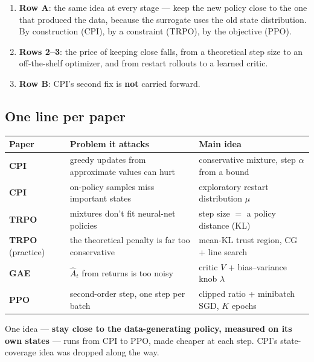 \begin{enumerate}
  \item \textbf{Row A}: the same idea at every stage --- keep the new policy close to the one that produced the data, because the surrogate uses the old state distribution. By construction (CPI), by a constraint (TRPO), by the objective (PPO).
  \item \textbf{Rows 2--3}: the price of keeping close falls, from a theoretical step size to an off-the-shelf optimizer, and from restart rollouts to a learned critic.
  \item \textbf{Row B}: CPI's second fix is \textbf{not} carried forward.
\end{enumerate}

\subsection{One line per paper}

\begin{center}
\small
\begin{tabularx}{\linewidth}{@{}l L L@{}}
\toprule
\textbf{Paper} & \textbf{Problem it attacks} & \textbf{Main idea} \\
\midrule
\textbf{CPI} & greedy updates from approximate values can hurt & conservative mixture, step $\alpha$ from a bound \\
\textbf{CPI} & on-policy samples miss important states & exploratory restart distribution $\mu$ \\
\textbf{TRPO} & mixtures don't fit neural-net policies & step size $=$ a policy distance (KL) \\
\textbf{TRPO} (practice) & the theoretical penalty is far too conservative & mean-KL trust region, CG + line search \\
{\color{AtlasWarm}\textbf{GAE}} & $\hat A_t$ from returns is too noisy & critic $V$ + bias--variance knob $\lambda$ \\
{\color{AtlasCool}\textbf{PPO}} & second-order step, one step per batch & clipped ratio + minibatch SGD, $K$ epochs \\
\bottomrule
\end{tabularx}
\end{center}

\begin{keybox}[title={Take-home}]
One idea --- \textbf{stay close to the data-generating policy, measured on its own states} --- runs from CPI to PPO, made cheaper at each step. CPI's state-coverage idea was dropped along the way.
\end{keybox}
